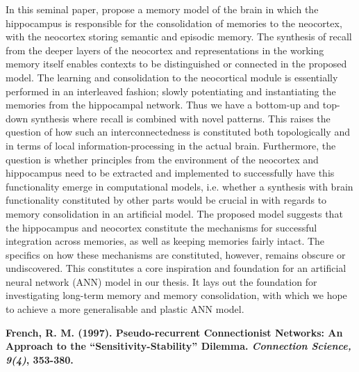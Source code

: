 In this seminal paper, \cite{McClelland1995} propose a memory model of the brain in which the hippocampus is responsible for the consolidation of memories to the neocortex, with the neocortex storing semantic and episodic memory. The synthesis of recall from the deeper layers of the neocortex and representations in the working memory itself enables contexts to be distinguished or connected in the proposed model. The learning and consolidation to the neocortical module is essentially performed in an interleaved fashion; slowly potentiating and instantiating the memories from the hippocampal network. Thus we have a bottom-up and top-down synthesis where recall is combined with novel patterns. This raises the question of how such an interconnectedness is constituted both topologically and in terms of local information-processing in the actual brain. Furthermore, the question is whether principles from the environment of the neocortex and hippocampus need to be extracted and implemented to successfully have this functionality emerge in computational models, i.e. whether a synthesis with brain functionality constituted by other parts would be crucial in with regards to memory consolidation in an artificial model. The proposed model suggests that the hippocampus and neocortex constitute the mechanisms for successful integration across memories, as well as keeping memories fairly intact. The specifics on how these mechanisms are constituted, however, remains obscure or undiscovered. This constitutes a core inspiration and foundation for an artificial neural network (ANN) model in our thesis. It lays out the foundation for investigating long-term memory and memory consolidation, with which we hope to achieve a more generalisable and plastic ANN model.


\textbf{French, R. M. (1997). Pseudo-recurrent Connectionist Networks: An Approach to the “Sensitivity-Stability” Dilemma. \textit{Connection Science, 9(4)}, 353-380.}

